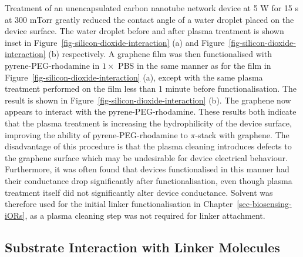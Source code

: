\documentclass[
  a4paper,
]{scrbook}
\begin{document}
Treatment of an unencapsulated carbon nanotube network device at 5 W for
15 s at 300 mTorr greatly reduced the contact angle of a water droplet
placed on the device surface. The water droplet before and after plasma
treatment is shown inset in Figure~\ref{fig-silicon-dioxide-interaction}
(a) and Figure~\ref{fig-silicon-dioxide-interaction} (b) respectively. A
graphene film was then functionalised with pyrene-PEG-rhodamine in
\(1 \times\) PBS in the same manner as for the film in
Figure~\ref{fig-silicon-dioxide-interaction} (a), except with the same
plasma treatment performed on the film less than 1 minute before
functionalisation. The result is shown in
Figure~\ref{fig-silicon-dioxide-interaction} (b). The graphene now
appears to interact with the pyrene-PEG-rhodamine. These results both
indicate that the plasma treatment is increasing the hydrophilicity of
the device surface, improving the ability of pyrene-PEG-rhodamine to
\(\pi\)-stack with graphene. The disadvantage of this procedure is that
the plasma cleaning introduces defects to the graphene surface which may
be undesirable for device electrical behaviour. Furthermore, it was
often found that devices functionalised in this manner had their
conductance drop significantly after functionalisation, even though
plasma treatment itself did not significantly alter device conductance.
Solvent was therefore used for the initial linker functionalisation in
Chapter~\ref{sec-biosensing-iORs}, as a plasma cleaning step was not
required for linker attachment.

\hypertarget{sec-pyrene-interactions}{%
\subsection{Substrate Interaction with Linker
Molecules}\label{sec-pyrene-interactions}}
\end{document}
